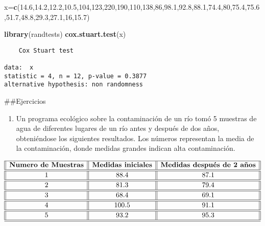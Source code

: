 \documentclass[
  a4paper,
  oneside,
  openany]{book}
\newenvironment{Shaded}{\begin{snugshade}}{\end{snugshade}}
\newcommand{\DecValTok}[1]{\textcolor[rgb]{0.00,0.00,0.81}{#1}}
\newcommand{\FloatTok}[1]{\textcolor[rgb]{0.00,0.00,0.81}{#1}}
\newcommand{\KeywordTok}[1]{\textcolor[rgb]{0.13,0.29,0.53}{\textbf{#1}}}
\newcommand{\NormalTok}[1]{#1}
\providecommand{\tightlist}{%
  \setlength{\itemsep}{0pt}\setlength{\parskip}{0pt}}
\begin{document}
\begin{Shaded}
\begin{Highlighting}[]
\NormalTok{x=}\KeywordTok{c}\NormalTok{(}\FloatTok{14.6}\NormalTok{,}\FloatTok{14.2}\NormalTok{,}\FloatTok{12.2}\NormalTok{,}\FloatTok{10.5}\NormalTok{,}\DecValTok{104}\NormalTok{,}\DecValTok{123}\NormalTok{,}\DecValTok{220}\NormalTok{,}\DecValTok{190}\NormalTok{,}\DecValTok{110}\NormalTok{,}\DecValTok{138}\NormalTok{,}\DecValTok{86}\NormalTok{,}\FloatTok{98.1}\NormalTok{,}\FloatTok{92.8}\NormalTok{,}\FloatTok{88.1}\NormalTok{,}\FloatTok{74.4}\NormalTok{,}\DecValTok{80}\NormalTok{,}\FloatTok{75.4}\NormalTok{,}\FloatTok{75.6}\NormalTok{,}\FloatTok{51.7}\NormalTok{,}\FloatTok{48.8}\NormalTok{,}\FloatTok{29.3}\NormalTok{,}\FloatTok{27.1}\NormalTok{,}\DecValTok{16}\NormalTok{,}\FloatTok{15.7}\NormalTok{)}


\KeywordTok{library}\NormalTok{(randtests)}
\KeywordTok{cox.stuart.test}\NormalTok{(x)}
\end{Highlighting}
\end{Shaded}

\begin{verbatim}
    Cox Stuart test

data:  x
statistic = 4, n = 12, p-value = 0.3877
alternative hypothesis: non randomness
\end{verbatim}

\#\#Ejercicios

\begin{enumerate}
\def\labelenumi{\arabic{enumi}.}
\tightlist
\item
  Un programa ecológico sobre la contaminación de un río tomó 5 muestras de agua de diferentes lugares de un río antes y después de dos años, obteniéndose los siguientes resultados. Los números representan la media de la contaminación, donde medidas grandes indican alta contaminación.
\end{enumerate}

\[
\begin{array}{||c| |c| |c||} 
\hline 
\textbf{Numero de Muestras} & \textbf{Medidas iniciales} & \textbf{Medidas después de 2 años}  \\  
\hline
\hline
1 &88.4& 87.1 \\
\hline
\hline
2& 81.3 &79.4 \\
\hline
\hline
3 &68.4 & 69.1 \\
\hline
\hline
4 &100.5& 91.1 \\
\hline
\hline
5 & 93.2&95.3 \\
\hline
\hline
\end{array}
\]
\end{document}
